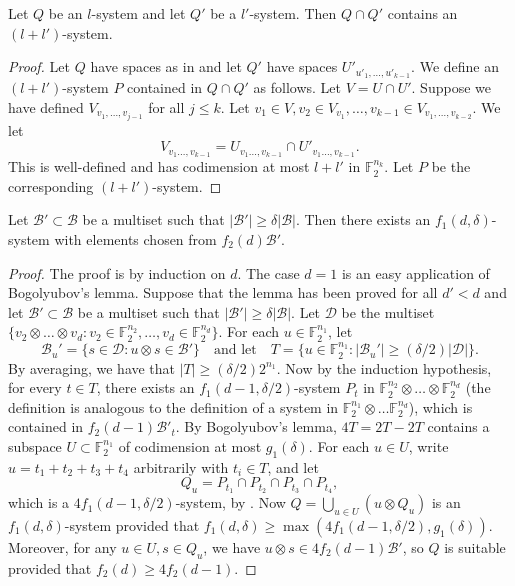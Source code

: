 \documentclass{toc}
\newcommand\F{\mathbb{F}}
\renewcommand\d{\delta}
\newcommand \cB{\mathcal B}
\newcommand \cD{\mathcal D}
\newcommand \s{\subset}
\begin{document}
\begin{lemma} \label{intersect}
	Let $Q$ be an $l$-system and let $Q'$ be a $l'$-system. Then $Q\cap Q'$ contains an $(l+l')$-system.
\end{lemma}

\begin{proof}
	Let $Q$ have spaces as in  and let $Q'$ have spaces $U'_{u'_1,\dots,u'_{k-1}}$.
	We define an $(l+l')$-system $P$ contained in $Q\cap Q'$ as follows. Let $V=U\cap U'$. Suppose we have defined $V_{v_1,\dots,v_{j-1}}$ for all $j\leq k$. Let $v_1\in V,v_2\in V_{v_1},\dots,v_{k-1}\in V_{v_1,\dots,v_{k-2}}$.  We let \[
          V_{v_1\dots,v_{k-1}}=U_{v_1\dots,v_{k-1}}\cap U'_{v_1\dots,v_{k-1}}.
        \]
        This is well-defined and has codimension at most $l+l'$ in
        $\F_2^{n_k}$. Let $P$ be the corresponding $(l+l')$-system.
\end{proof}

\begin{lemma} \label{findsystem}
	Let $\cB'\subset \cB$ be a multiset such that $|\cB'|\geq \delta |\cB|$. Then there exists an $f_1(d,\d)$-system with elements chosen from $f_2(d)\cB'$.
\end{lemma}

\begin{proof}
  The proof is by induction on $d$. The case $d=1$ is an easy application of Bogolyubov's lemma. Suppose that the lemma has been proved for all $d'<d$ and let $\cB'\subset \cB$ be a multiset such that $|\cB'|\geq \delta |\cB|$. Let $\cD$ be the multiset $\{v_2\otimes\dots\otimes v_d: v_2\in \F_2^{n_2},\dots,v_d\in \F_2^{n_d}\}$. For each $u\in \F_2^{n_1}$, let \[
    \cB_u'=\{s\in \cD: u\otimes s\in \cB'\}\quad\text{and let}\quad T=\{u\in \F_2^{n_1}: |\cB_u'|\geq ({\delta}/{2})|\cD| \}.
  \]
  By averaging, we have that $|T|\geq ({\delta}/{2}) 2^{n_1}$. Now by
  the induction hypothesis, for every $t\in T$, there exists an
  $f_1(d-1,\d/2)$-system $P_t$ in
  $\F_2^{n_2}\otimes \dots \otimes \F_2^{n_d}$ (the definition is
  analogous to the definition of a system in
  $\F_2^{n_1}\otimes \dots \F_2^{n_d}$), which is contained in
  $f_2(d-1)\cB'_t$. By Bogolyubov's lemma, $4T=2T-2T$ contains a
  subspace $U\s \F_2^{n_1}$ of codimension at most $g_1(\d)$. For each
  $u\in U$, write $u=t_1+t_2+t_3+t_4$ arbitrarily with $t_i\in T$, and
  let
  \[
    Q_u=P_{t_1}\cap P_{t_2}\cap P_{t_3}\cap P_{t_4},
  \]
  which is a $4f_1(d-1,\d/2)$-system, by
  . Now $Q=\bigcup_{u\in U} (u\otimes Q_u)$
  is an $f_1(d,\d)$-system provided that
  $f_1(d,\d)\geq \max(4f_1(d-1,\d/2),g_1(\d))$. Moreover, for any
  $u\in U,s\in Q_u$, we have $u\otimes s\in 4f_2(d-1)\cB'$, so $Q$ is
  suitable provided that $f_2(d)\geq 4f_2(d-1)$.
\end{proof}
\end{document}
